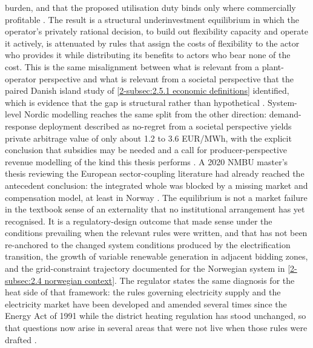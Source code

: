 burden, and that the proposed utilisation duty binds only where commercially profitable \cite{det_kongelige_energidepartement_endringer_2026}. The result is a structural underinvestment equilibrium in which the operator's privately rational decision, to build out flexibility capacity and operate it actively, is attenuated by rules that assign the costs of flexibility to the actor who provides it while distributing its benefits to actors who bear none of the cost. This is the same misalignment between what is relevant from a plant-operator perspective and what is relevant from a societal perspective that the paired Danish island study of \autoref{2-subsec:2.5.1 economic definitions} identified, which is evidence that the gap is structural rather than hypothetical \cite{ostergaard_business_2019}. System-level Nordic modelling reaches the same split from the other direction: demand-response deployment described as no-regret from a societal perspective yields private arbitrage value of only about 1.2 to 3.6 EUR/MWh, with the explicit conclusion that subsidies may be needed and a call for producer-perspective revenue modelling of the kind this thesis performs \cite{nagel_european_2023}. A 2020 NMBU master's thesis reviewing the European sector-coupling literature had already reached the antecedent conclusion: the integrated whole was blocked by a missing market and compensation model, at least in Norway \cite{verbeeten_state--art_2020}. The equilibrium is not a market failure in the textbook sense of an externality that no institutional arrangement has yet recognised. It is a regulatory-design outcome that made sense under the conditions prevailing when the relevant rules were written, and that has not been re-anchored to the changed system conditions produced by the electrification transition, the growth of variable renewable generation in adjacent bidding zones, and the grid-constraint trajectory documented for the Norwegian system in \autoref{2-subsec:2.4 norwegian context}. The regulator states the same diagnosis for the heat side of that framework: the rules governing electricity supply and the electricity market have been developed and amended several times since the Energy Act of 1991 while the district heating regulation has stood unchanged, so that questions now arise in several areas that were not live when those rules were drafted \cite{nve_nves_2024}.

